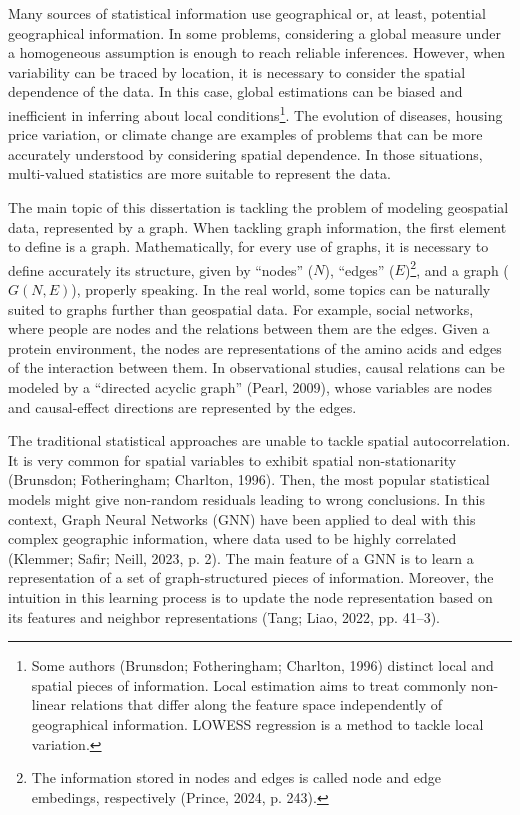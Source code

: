 \documentclass[12pt, a4paper, twoside]{article}
\numberwithin{equation}{subsection} %
\begin{document}
Many sources of statistical information use geographical or, at least,
potential geographical information. In some problems, considering a
global measure under a homogeneous assumption is enough to reach
reliable inferences. However, when variability can be traced by
location, it is necessary to consider the spatial dependence of the
data. In this case, global estimations can be biased and inefficient in
inferring about local conditions\footnote{Some authors (Brunsdon;
  Fotheringham; Charlton, 1996) distinct local and spatial pieces of
  information. Local estimation aims to treat commonly non-linear
  relations that differ along the feature space independently of
  geographical information. LOWESS regression is a method to tackle
  local variation.}. The evolution of diseases, housing price variation,
or climate change are examples of problems that can be more accurately
understood by considering spatial dependence. In those situations,
multi-valued statistics are more suitable to represent the data.

The main topic of this dissertation is tackling the problem of modeling
geospatial data, represented by a graph. When tackling graph
information, the first element to define is a graph. Mathematically, for
every use of graphs, it is necessary to define accurately its structure,
given by ``nodes'' (\(N\)), ``edges'' (\(E\))\footnote{The information
  stored in nodes and edges is called node and edge embedings,
  respectively (Prince, 2024, p. 243).}, and a graph (\(G(N, E)\)),
properly speaking. In the real world, some topics can be naturally
suited to graphs further than geospatial data. For example, social
networks, where people are nodes and the relations between them are the
edges. Given a protein environment, the nodes are representations of the
amino acids and edges of the interaction between them. In observational
studies, causal relations can be modeled by a ``directed acyclic graph''
(Pearl, 2009), whose variables are nodes and causal-effect directions
are represented by the edges.

The traditional statistical approaches are unable to tackle spatial
autocorrelation. It is very common for spatial variables to exhibit
spatial non-stationarity (Brunsdon; Fotheringham; Charlton, 1996). Then,
the most popular statistical models might give non-random residuals
leading to wrong conclusions. In this context, Graph Neural Networks
(GNN) have been applied to deal with this complex geographic
information, where data used to be highly correlated (Klemmer; Safir;
Neill, 2023, p. 2). The main feature of a GNN is to learn a
representation of a set of graph-structured pieces of information.
Moreover, the intuition in this learning process is to update the node
representation based on its features and neighbor representations (Tang;
Liao, 2022, pp. 41--3).
\end{document}
